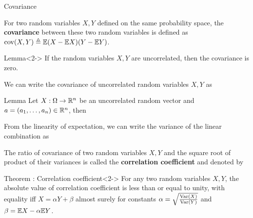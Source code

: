 \documentclass[12pt,aspectratio=169]{beamer}
\begin{document}
\begin{frame}{Covariance}
\begin{Definition}[Covariance] 
For two random variables $X,Y$ defined on the same probability space, 
the \textbf{covariance} between these two random variables is defined as $\operatorname{cov}(X,Y) \triangleq \mathbb{E}(X-\mathbb{E} X)(Y-\mathbb{E} Y)$. 
\end{Definition}
\begin{block}{Lemma}<2->
If the random variables $X,Y$ are uncorrelated, then the covariance is zero. 
\end{block}
\end{frame}
\begin{frame}
\begin{Proof}
We can write the covariance of uncorrelated random variables $X, Y$ as 
\end{Proof}
\end{frame}
\begin{frame}
\begin{block}{Lemma}
Let $X: \Omega \to \mathbb{R}^n$ be an uncorrelated random vector and $a = (a_1, \dots, a_n) \in \mathbb{R}^n$, then 
\end{block}
\end{frame}
\begin{frame}
\begin{Proof}
From the linearity of expectation, we can write the variance of the linear combination as 
\end{Proof}
\end{frame}
\begin{frame}
\begin{Definition} 
The ratio of covariance of two random variables $X,Y$ and the square root of product of their variances is called the \textbf{correlation coefficient} and denoted by
\end{Definition}
\begin{block}{Theorem : Correlation coefficient}<2->
For any two random variables $X,Y$, the absolute value of correlation coefficient is less than or equal to unity, with equality iff $X = \alpha Y + \beta$ almost surely for constants $\alpha = \sqrt{\frac{\operatorname{Var}(X)}{\operatorname{Var}(Y)}}$ and $\beta = \mathbb{E} X - \alpha \mathbb{E} Y$. 
\end{block}
\end{frame}
\end{document}
